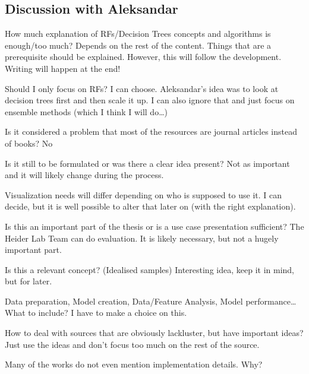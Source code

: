\documentclass[a4paper, 12pt]{article}
\begin{document}
\subsection{Discussion with Aleksandar}
\begin{description}[font=$\bullet$~\normalfont]
        \item[Explainations:]How much explanation of RFs/Decision Trees concepts and algorithms is enough/too much?
        \textemdash Depends on the rest of the content. Things that are a prerequisite should be explained.
        However, this will follow the development. Writing will happen at the end!
        \item[Other ensemble methods:]Should I only focus on RFs?
        \textemdash I can choose. Aleksandar's idea was to look at decision trees first and then scale it up.
        I can also ignore that and just focus on ensemble methods (which I think I will do\dots)
        \item[Online vs. books:]Is it considered a problem that most of the resources are journal articles instead
        of books?
        \textemdash No
        \item[Research question:]Is it still to be formulated or was there a clear idea present?
        \textemdash Not as important and it will likely change during the process. 
        \item[Target audience:]Visualization needs will differ depending on who is supposed to use it.
        \textemdash I can decide, but it is well possible to alter that later on (with the right explanation).
        \item[Evaluation:]Is this an important part of the thesis or is a use case presentation sufficient?
        \textemdash The Heider Lab Team can do evaluation. It is likely necessary, but not a hugely important part.
        \item[Prototypes:] Is this a relevant concept? (Idealised samples)
        \textemdash Interesting idea, keep it in mind, but for later. 
        \item[Scope:]Data preparation, Model creation, Data/Feature Analysis, Model performance\dots What to include?
        \textemdash I have to make a choice on this.
        \item[\textit{Bad} Sources:]How to deal with sources that are obviously lackluster, but have important ideas?
        \textemdash Just use the ideas and don't focus too much on the rest of the source. 
        \item[Technical explanations:]Many of the works do not even mention implementation details. Why?

\end{description}
\end{document}
